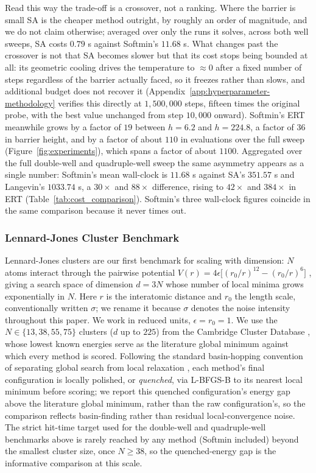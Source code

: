 \documentclass{article} %
\theoremstyle{plain}
\theoremstyle{definition}
\theoremstyle{remark}
\begin{document}
Read this way the trade-off is a crossover, not a ranking. Where the barrier is small SA is the cheaper method outright, by roughly an order of magnitude, and we do not claim otherwise; averaged over only the runs it solves, across both well sweeps, SA costs $0.79$ s against Softmin's $11.68$ s. What changes past the crossover is not that SA becomes slower but that its cost stops being bounded at all: its geometric cooling drives the temperature to $\approx0$ after a fixed number of steps regardless of the barrier actually faced, so it freezes rather than slows, and additional budget does not recover it (Appendix~\ref{app:hyperparameter-methodology} verifies this directly at $1{,}500{,}000$ steps, fifteen times the original probe, with the best value unchanged from step $10{,}000$ onward). Softmin's ERT meanwhile grows by a factor of $19$ between $h=6.2$ and $h=224.8$, a factor of $36$ in barrier height, and by a factor of about $110$ in evaluations over the full sweep (Figure~\ref{fig:experiments}), which spans a factor of about $1100$. Aggregated over the full double-well and quadruple-well sweep the same asymmetry appears as a single number: Softmin's mean wall-clock is $11.68$ s against SA's $351.57$ s and Langevin's $1033.74$ s, a $30\times$ and $88\times$ difference, rising to $42\times$ and $384\times$ in ERT (Table~\ref{tab:cost_comparison}). Softmin's three wall-clock figures coincide in the same comparison because it never times out.

\subsubsection{Lennard-Jones Cluster Benchmark}
\label{apx:lj}

Lennard-Jones clusters are our first benchmark for scaling with dimension: $N$ atoms interact through the pairwise potential $V(r)=4\epsilon\bigl[(r_0/r)^{12}-(r_0/r)^6\bigr]$ \citep{jones1924determination}, giving a search space of dimension $d=3N$ whose number of local minima grows exponentially in $N$. Here $r$ is the interatomic distance and $r_0$ the length scale, conventionally written $\sigma$; we rename it because $\sigma$ denotes the noise intensity throughout this paper. We work in reduced units, $\epsilon=r_0=1$. We use the $N\in\{13,38,55,75\}$ clusters ($d$ up to $225$) from the Cambridge Cluster Database \citep{wales1997global}, whose lowest known energies serve as the literature global minimum against which every method is scored. Following the standard basin-hopping convention of separating global search from local relaxation \citep{wales1997global}, each method's final configuration is locally polished, or \emph{quenched}, via L-BFGS-B to its nearest local minimum before scoring; we report this quenched configuration's energy gap above the literature global minimum, rather than the raw configuration's, so the comparison reflects basin-finding rather than residual local-convergence noise. The strict hit-time target used for the double-well and quadruple-well benchmarks above is rarely reached by any method (Softmin included) beyond the smallest cluster size, once $N\geq38$, so the quenched-energy gap is the informative comparison at this scale.
\end{document}
